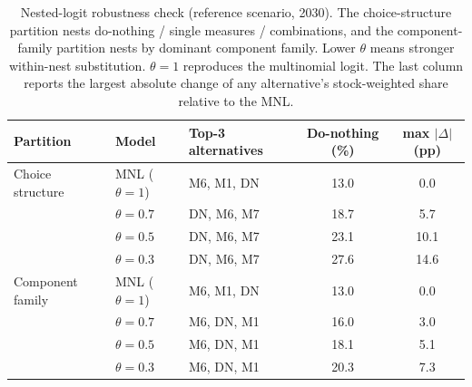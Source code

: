 \begin{table}[htbp]
\centering
\caption{Nested-logit robustness check (reference scenario, 2030). The choice-structure partition nests do-nothing / single measures / combinations, and the component-family partition nests by dominant component family. Lower $\theta$ means stronger within-nest substitution. $\theta=1$ reproduces the multinomial logit. The last column reports the largest absolute change of any alternative's stock-weighted share relative to the MNL.}
\label{tab:nl}
\small
\begin{tabular}{lllcc}
\toprule
Partition & Model & Top-3 alternatives & Do-nothing (\%) & max $|\Delta|$ (pp) \\
\midrule
Choice structure & MNL ($\theta=1$) & M6, M1, DN & 13.0 & 0.0 \\
 & $\theta=0.7$ & DN, M6, M7 & 18.7 & 5.7 \\
 & $\theta=0.5$ & DN, M6, M7 & 23.1 & 10.1 \\
 & $\theta=0.3$ & DN, M6, M7 & 27.6 & 14.6 \\
Component family & MNL ($\theta=1$) & M6, M1, DN & 13.0 & 0.0 \\
 & $\theta=0.7$ & M6, DN, M1 & 16.0 & 3.0 \\
 & $\theta=0.5$ & M6, DN, M1 & 18.1 & 5.1 \\
 & $\theta=0.3$ & M6, DN, M1 & 20.3 & 7.3 \\
\bottomrule
\end{tabular}
\end{table}
